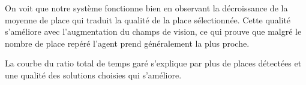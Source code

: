 On voit que notre système fonctionne bien en observant la décroissance de la moyenne de place qui traduit la qualité de la place sélectionnée. Cette qualité s'améliore avec l'augmentation du champs de vision, ce qui prouve que malgré le nombre de place repéré l'agent prend généralement la plus proche.

La courbe du ratio total de temps garé s'explique par plus de places détectées et une qualité des solutions choisies qui s'améliore.

\begin{figure}
  \begin{center}
    
    

\end{center}
\end{figure}
